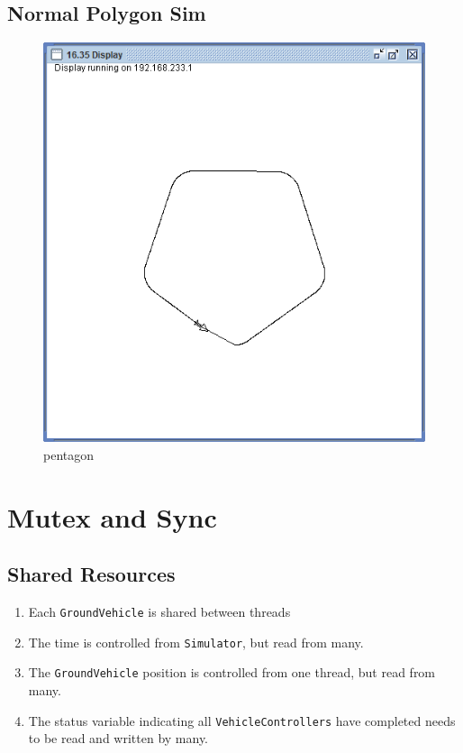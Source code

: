 \documentclass{article}
\begin{document}
\subsection{Normal Polygon Sim}
\begin{figure}
\centering
\includegraphics[width=0.7\linewidth]{pentagon}
\caption{pentagon}
\label{fig:pentagon}
\end{figure}


\section{Mutex and Sync}
\subsection{Shared Resources}
\begin{enumerate}
	\item Each \verb|GroundVehicle| is shared between threads
	\item The time is controlled from \verb|Simulator|, but read from many.
	\item The \verb|GroundVehicle| position is controlled from one thread, but read from many.
	\item The status variable indicating all \verb|VehicleControllers| have completed needs to be read and written by many.
\end{enumerate}
\end{document}

